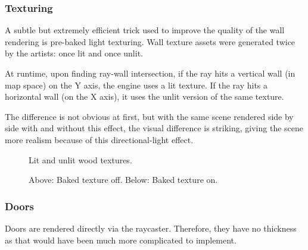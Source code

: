 \subsubsection{Texturing}
A subtle but extremely efficient trick used to improve the quality of the wall rendering is pre-baked light texturing. Wall texture assets were generated twice by the artists: once lit and once unlit.\\
\par
At runtime, upon finding ray-wall intersection, if the ray hits a vertical wall (in map space) on the Y axis, the engine uses a lit texture. If the ray hits a horizontal wall (on the X axis), it uses the unlit version of the same texture.\\
\par
 The difference is not obvious at first, but with the same scene rendered side by side with and without this effect, the visual difference is striking, giving the scene more realism because of this directional-light effect.\\
 \vspace{10pt}
\par
  \begin{figure}[H]
\centering
 \caption{Lit and unlit wood textures.}
 \end{figure}
\par

\begin{minipage}{\textwidth}
\begin{figure}[H]
\centering
 \caption{Above: Baked texture off. Below: Baked texture on.}
 \end{figure}

\begin{figure}[H]
\centering
 
 \end{figure}
 \end{minipage}

 





\subsubsection{Doors}
Doors are rendered directly via the raycaster. Therefore, they have no thickness as that would have been much more complicated to implement.\\
\par
\begin{figure}[H]
 \centering
\end{figure}

